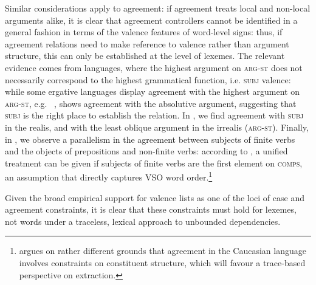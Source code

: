 \documentclass[output=paper
,notxmath 
	        ,collection
	        ,collectionchapter
 	        ,biblatex
                ,babelshorthands
                ,newtxmath
                ,draftmode
                ,colorlinks, citecolor=brown
]{langscibook}
\begin{document}
Similar considerations apply to agreement: if agreement treats local
and non-local arguments alike, it is clear that agreement controllers
cannot be identified in a general fashion in terms of the valence
features of word-level signs: thus, if agreement relations need to make
reference to valence rather than argument structure, this can only be
established at the level of lexemes. The relevant evidence comes from
languages, where the highest argument on \textsc{arg-st} does not
necessarily correspond to the highest grammatical function, i.e.
\textsc{subj} valence: while some ergative languages display agreement
with the highest argument on \textsc{arg-st}, e.g.\ 
\citep{harris_a84udi},  \citep{kibrik94:_archi} shows agreement
with the absolutive argument, suggesting that \textsc{subj} is the
right place to establish the relation. %
In  \citep{Crysmann:09}, we find agreement with \textsc{subj} in the realis, and with
the least oblique argument in the irrealis (\textsc{arg-st}). Finally,
in , we observe a parallelism in the agreement between subjects
of finite verbs and the objects of prepositions and non-finite verbs:
according to \citet[Section~4]{Borsley89}, a unified treatment can be given if
subjects of finite verbs are the first element on \textsc{comps}, an
assumption that directly captures  VSO word order.\footnote{
  \citet[Section~5.4]{Borsley:16:Archi} argues on rather different grounds that
  agreement in the Caucasian language  involves constraints on
  constituent structure, which will favour a trace-based perspective on
  extraction. }

Given the broad empirical support for valence lists as one of the loci
of case and agreement constraints, it is clear that these constraints
must hold for lexemes, not words under a traceless, lexical
approach to unbounded dependencies.





\end{document}
